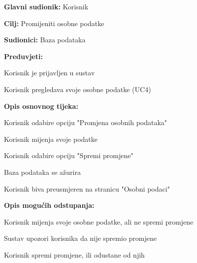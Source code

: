 					\noindent {}
					\begin{packed_item}
	
						\item \textbf{Glavni sudionik: }Korisnik
						\item  \textbf{Cilj:} Promijeniti osobne podatke
						\item  \textbf{Sudionici:} Baza podataka
						\item  \textbf{Preduvjeti:}
						\item[] \begin{packed_enum}
							\item Korisnik je prijavljen u sustav
							\item Korisnik pregledava svoje osobne podatke (UC4)
						\end{packed_enum}
						\item  \textbf{Opis osnovnog tijeka:}
						
						\item[] \begin{packed_enum}
	
							\item Korisnik odabire opciju "Promjena osobnih podataka"
							\item Korisnik mijenja svoje podatke
							\item Korisnik odabire opciju "Spremi promjene"
							\item Baza podataka se ažurira
							\item Korisnik biva preusmjeren na stranicu "Osobni podaci"
						\end{packed_enum}
						
						\item  \textbf{Opis mogućih odstupanja:}
						
						\item[] \begin{packed_item}
	
							\item[3.a] Korisnik mijenja svoje osobne podatke, ali ne spremi promjene
							\item[] \begin{packed_enum}
								
								\item Sustav upozori korisnika da nije spremio promjene
								\item Korisnik spremi promjene, ili odustane od njih
								
							\end{packed_enum}
							

\end{packed_item}
\end{packed_item}
